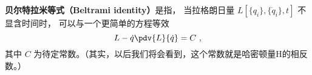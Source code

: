 
\begin{issues}
\issueDraft
\end{issues}


\textbf{贝尔特拉米等式（Beltrami identity）}是指， 当拉格朗日量 $L[\{q_i\}, \{\dot q_i\}, t]$ 不显含时间时， 可以与一个更简单的方程等效
\begin{equation}
L - \dot q \pdv{L}{\dot q} = C~,
\end{equation}
其中 $C$ 为待定常数。（其实，以后我们将会看到，这个常数就是哈密顿量H的相反数。）